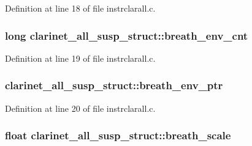 Definition at line 18 of file instrclarall.\+c.

\subsubsection[{\texorpdfstring{breath\+\_\+env\+\_\+cnt}{breath_env_cnt}}]{\setlength{\rightskip}{0pt plus 5cm}long clarinet\+\_\+all\+\_\+susp\+\_\+struct\+::breath\+\_\+env\+\_\+cnt}\hypertarget{structclarinet__all__susp__struct_abec9d270a850f01f877d8d806f67e086}{}\label{structclarinet__all__susp__struct_abec9d270a850f01f877d8d806f67e086}


Definition at line 19 of file instrclarall.\+c.

\subsubsection[{\texorpdfstring{breath\+\_\+env\+\_\+ptr}{breath_env_ptr}}]{ clarinet\+\_\+all\+\_\+susp\+\_\+struct\+::breath\+\_\+env\+\_\+ptr}\hypertarget{structclarinet__all__susp__struct_ad25a3a25b51c7adaa30ab03182f75f9f}{}\label{structclarinet__all__susp__struct_ad25a3a25b51c7adaa30ab03182f75f9f}


Definition at line 20 of file instrclarall.\+c.

\subsubsection[{\texorpdfstring{breath\+\_\+scale}{breath_scale}}]{\setlength{\rightskip}{0pt plus 5cm}float clarinet\+\_\+all\+\_\+susp\+\_\+struct\+::breath\+\_\+scale}\hypertarget{structclarinet__all__susp__struct_a31b80eb32132bd85a75a4f5fcb1726e7}{}\label{structclarinet__all__susp__struct_a31b80eb32132bd85a75a4f5fcb1726e7}


